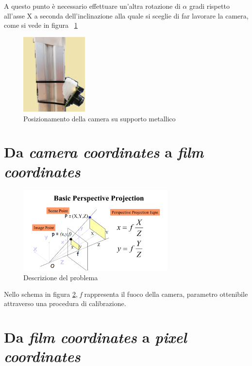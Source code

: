 A questo punto è necessario effettuare un'altra rotazione di $\alpha$ gradi rispetto all'asse X a seconda dell'inclinazione alla quale si sceglie di far lavorare la camera, come si vede in figura ~\ref{fig:cameraSupport}

\begin{figure}
	\centering
	\includegraphics[width=0.3\textwidth]{Immagini/CameraSupport.png}
	\caption{Posizionamento della camera su supporto metallico}
	\label{fig:cameraSupport}
\end{figure}

\section{Da \textit{camera coordinates} a \textit{film coordinates}}
\begin{figure}[H]
	\centering
	\includegraphics[width=0.7\textwidth]{Immagini/perspective_projection.png}
	\caption{Descrizione del problema}
	\label{fig:perspective_projection}
\end{figure}
Nello schema in figura \ref{fig:perspective_projection}, \textit{f} rappresenta il fuoco della camera, parametro ottenibile attraverso una procedura di calibrazione.

\section{Da \textit{film coordinates} a \textit{pixel coordinates}}

